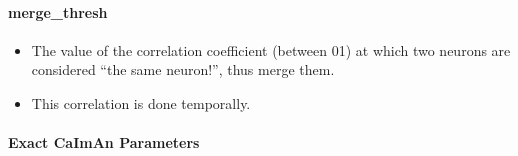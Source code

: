 \documentclass[letterpaper,10pt,english]{sphinxmanual}
\begin{document}
\paragraph{merge\_thresh}
\label{\detokenize{user_guide/segmentation:merge-thresh}}\begin{itemize}
\item {} 
\sphinxAtStartPar
The value of the correlation coefficient (between 0\sphinxhyphen{}1) at which two neurons are considered “the same neuron!”, thus merge them.

\item {} 
\sphinxAtStartPar
This correlation is done temporally.

\end{itemize}


\paragraph{Exact CaImAn Parameters}
\label{\detokenize{user_guide/segmentation:exact-caiman-parameters}}
\end{document}
